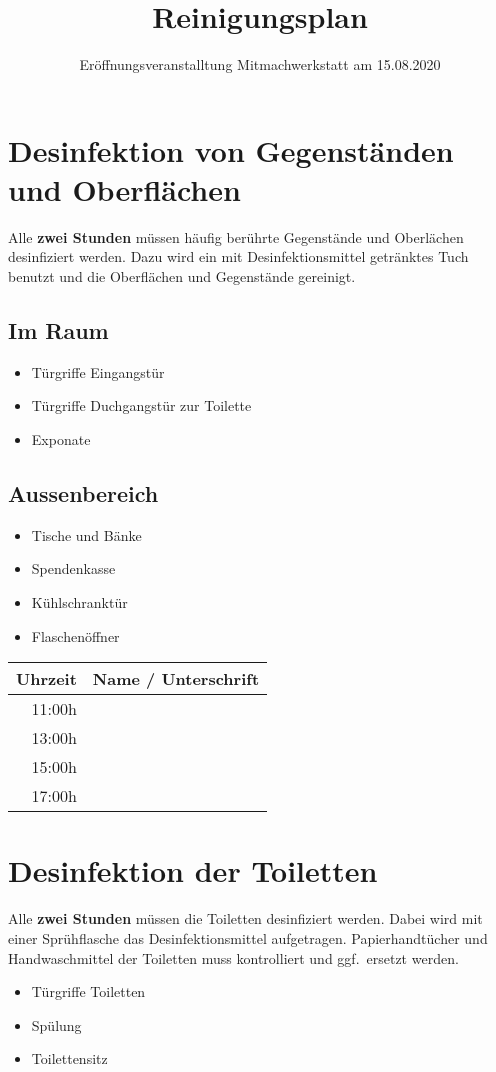 \documentclass[10pt,a4paper]{scrartcl}
\title{Reinigungsplan}
\subtitle{Eröffnungsveranstalltung Mitmachwerkstatt am 15.08.2020}
\date{\vspace{-8ex}}
\begin{document}
\maketitle

\renewcommand{\arraystretch}{2.0}

\section{Desinfektion von Gegenständen und Oberflächen}
Alle \textbf{zwei Stunden} müssen häufig berührte Gegenstände und Oberlächen desinfiziert werden. Dazu wird ein mit
Desinfektionsmittel getränktes Tuch benutzt und die Oberflächen und Gegenstände gereinigt.

\subsection{Im Raum}
\begin{itemize}
\item Türgriffe Eingangstür
\item Türgriffe Duchgangstür zur Toilette
\item Exponate
\end{itemize}

\subsection{Aussenbereich}
\begin{itemize}
\item Tische und Bänke
\item Spendenkasse
\item Kühlschranktür
\item Flaschenöffner
\end{itemize}


\begin{tabular}{ | r | p{15cm} |}
\hline
\textbf{Uhrzeit} & \textbf{Name / Unterschrift} \\ \hline
11:00h & \\ \hline
13:00h & \\ \hline
15:00h & \\ \hline
17:00h & \\ \hline
\end{tabular}

\vspace{4ex}

\section{Desinfektion der Toiletten}
Alle \textbf{zwei Stunden} müssen die Toiletten desinfiziert werden.
Dabei wird mit einer Sprühflasche das Desinfektionsmittel aufgetragen.
Papierhandtücher und Handwaschmittel der Toiletten muss kontrolliert und ggf.\ ersetzt werden.
\begin{itemize}
\item Türgriffe Toiletten
\item Spülung
\item Toilettensitz
\end{itemize}
\end{document}
